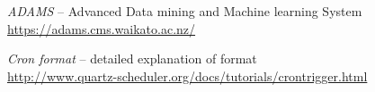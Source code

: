 %

\begin{thebibliography}{999}

		\textit{ADAMS} -- Advanced Data mining and Machine learning System \\
		\url{https://adams.cms.waikato.ac.nz/}{}
		
		\textit{Cron format} -- detailed explanation of format \\
		\url{http://www.quartz-scheduler.org/docs/tutorials/crontrigger.html}{}

\end{thebibliography}
